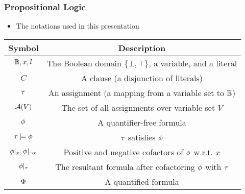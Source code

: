 \begin{frame}
    \frametitle{Propositional Logic}
    \begin{itemize}
        \item The notations used in this presentation
              \pause
    \end{itemize}
    \begin{table}[t]
        \centering
        \begin{tabular}{c|c}
            Symbol                      & Description                                                   \\
            \hline
            $\mathbb{B},x,l$              & The Boolean domain $\{\bot,\top\}$, a variable, and a literal \\
            $C$                         & A clause (a disjunction of literals)                          \\
            $\tau$                       & An assignment (a mapping from a variable set to $\mathbb{B}$)   \\
            $\mathcal{A}(V)$                    & The set of all assignments over variable set $V$              \\
            $\phi$                       & A quantifier-free formula                                     \\
            $\tau\models\phi$             & $\tau$ satisfies $\phi$                                         \\
            $\phi|_{x},\phi|_{\lnot x}$ & Positive and negative cofactors of $\phi$ w.r.t. $x$           \\
            $\phi|_{\tau}$            & The resultant formula after cofactoring $\phi$ with $\tau$      \\
            $\Phi$                       & A quantified formula                                          \\
        \end{tabular}
    \end{table}
\end{frame}